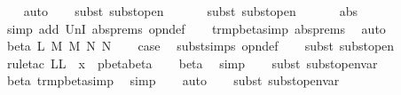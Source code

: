 \begin{isabellebody}
\ \ \isamarkupfalse%
\ auto{\isacharbrackleft}{}{\isacharbrackright}\isanewline
\ \ \isamarkupfalse%
\ {\isacharparenleft}subst\ subst{\isacharunderscore}open{}{\isacharparenright}\isanewline
\ \ \isamarkupfalse%
\isanewline
\ \ \isamarkupfalse%
\ {\isacharparenleft}subst\ subst{\isacharunderscore}open{}{\isacharparenright}\isanewline
\ \ \isamarkupfalse%
\isanewline
\ \ \isamarkupfalse%
\ abs{\isacharparenleft}{}{\isacharcomma}{}{\isacharparenright}\ \isamarkupfalse%
\ {\isacharparenleft}simp\ add{\isacharcolon}\ UnI{}\ abs{\isachardot}prems\ opn{\isacharprime}{\isacharunderscore}def{\isacharparenright}\isanewline
\ \ \isamarkupfalse%
\ trm{\isacharunderscore}pbeta{\isacharunderscore}simp{}\ abs{\isachardot}prems\ \isamarkupfalse%
\ auto\isanewline
\ \isamarkupfalse%
\isanewline
{}\isamarkupfalse%
\ {\isacharparenleft}beta\ L\ M\ M{\isacharprime}\ N\ N{\isacharprime}{\isacharparenright}\isanewline
\ \ \isamarkupfalse%
\ {\isacharquery}case\ \isamarkupfalse%
\ subst{\isachardot}simps\ opn{\isacharprime}{\isacharunderscore}def\isanewline
\ \ \isamarkupfalse%
\ {\isacharparenleft}subst\ subst{\isacharunderscore}open{\isacharparenright}\isanewline
\ \ \isamarkupfalse%
\isanewline
\ \ \isamarkupfalse%
\ {\isacharparenleft}rule{\isacharunderscore}tac\ L{\isacharequal}{\isachardoublequoteopen}L\ {\isasymunion}\ {\isacharbraceleft}x{\isacharbraceright}{\isachardoublequoteclose}\ \ pbeta{\isacharunderscore}beta{\isacharprime}{\isacharparenright}\isanewline
\ \ \isamarkupfalse%
\ beta\ \isamarkupfalse%
\ simp\isanewline
\ \ \isamarkupfalse%
\ {\isacharparenleft}subst\ subst{\isacharunderscore}open{\isacharunderscore}var{}{\isacharparenright}\isanewline
\ \ \isamarkupfalse%
\ beta\ trm{\isacharunderscore}pbeta{\isacharunderscore}simp{}\ \isamarkupfalse%
\ simp\isanewline
\ \ \isamarkupfalse%
\ auto{\isacharbrackleft}{}{\isacharbrackright}\isanewline
\ \ \isamarkupfalse%
\ {\isacharparenleft}subst\ subst{\isacharunderscore}open{\isacharunderscore}var{}{\isacharparenright}\isanewline
\ \ \isamarkupfalse%

\end{isabellebody}
